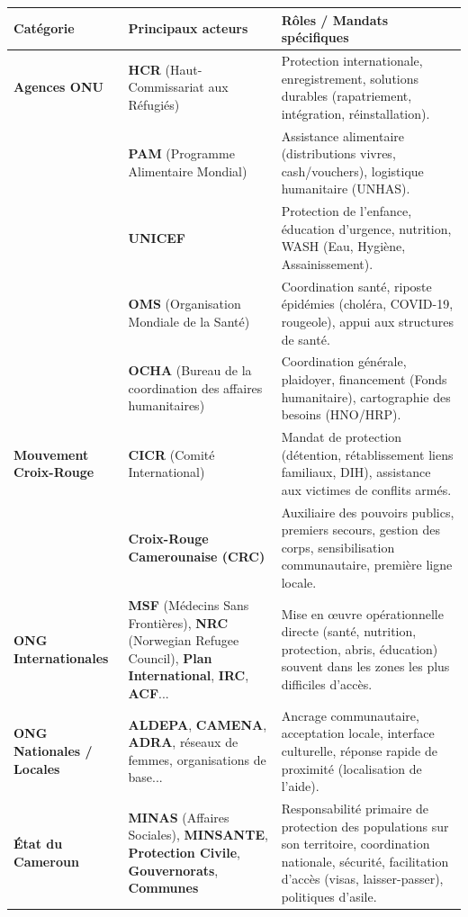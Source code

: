 \documentclass[11pt]{article}
\begin{document}
\begin{center}
\begin{tabularx}{\linewidth}{|l|X|X|}
\hline
\rowcolor{popblueL}
\textbf{Catégorie} & \textbf{Principaux acteurs} & \textbf{Rôles / Mandats spécifiques} \\
\hline
\textbf{Agences ONU} & \textbf{HCR} (Haut-Commissariat aux Réfugiés) & Protection internationale, enregistrement, solutions durables (rapatriement, intégration, réinstallation). \\
& \textbf{PAM} (Programme Alimentaire Mondial) & Assistance alimentaire (distributions vivres, cash/vouchers), logistique humanitaire (UNHAS). \\
& \textbf{UNICEF} & Protection de l'enfance, éducation d'urgence, nutrition, WASH (Eau, Hygiène, Assainissement). \\
& \textbf{OMS} (Organisation Mondiale de la Santé) & Coordination santé, riposte épidémies (choléra, COVID-19, rougeole), appui aux structures de santé. \\
& \textbf{OCHA} (Bureau de la coordination des affaires humanitaires) & Coordination générale, plaidoyer, financement (Fonds humanitaire), cartographie des besoins (HNO/HRP). \\
\hline
\textbf{Mouvement Croix-Rouge} & \textbf{CICR} (Comité International) & Mandat de protection (détention, rétablissement liens familiaux, DIH), assistance aux victimes de conflits armés. \\
& \textbf{Croix-Rouge Camerounaise (CRC)} & Auxiliaire des pouvoirs publics, premiers secours, gestion des corps, sensibilisation communautaire, première ligne locale. \\
\hline
\textbf{ONG Internationales} & \textbf{MSF} (Médecins Sans Frontières), \textbf{NRC} (Norwegian Refugee Council), \textbf{Plan International}, \textbf{IRC}, \textbf{ACF}... & Mise en œuvre opérationnelle directe (santé, nutrition, protection, abris, éducation) souvent dans les zones les plus difficiles d'accès. \\
\hline
\textbf{ONG Nationales / Locales} & \textbf{ALDEPA}, \textbf{CAMENA}, \textbf{ADRA}, réseaux de femmes, organisations de base... & Ancrage communautaire, acceptation locale, interface culturelle, réponse rapide de proximité (localisation de l'aide). \\
\hline
\textbf{État du Cameroun} & \textbf{MINAS} (Affaires Sociales), \textbf{MINSANTE}, \textbf{Protection Civile}, \textbf{Gouvernorats}, \textbf{Communes} & Responsabilité primaire de protection des populations sur son territoire, coordination nationale, sécurité, facilitation d'accès (visas, laisser-passer), politiques d'asile. \\
\hline
\end{tabularx}
\end{center}
\end{document}
